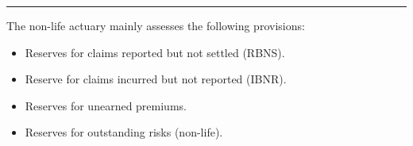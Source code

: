 \hrule

\begin{f}[Provision]
	
The non-life actuary mainly assesses
the following provisions:
\begin{itemize}
	\item Reserves for claims reported but not settled (RBNS).
	\item Reserve for claims incurred but not reported (IBNR).
	\item Reserves for unearned premiums.
	\item Reserves for outstanding risks (non-life).
	
\end{itemize}

\end{f}




